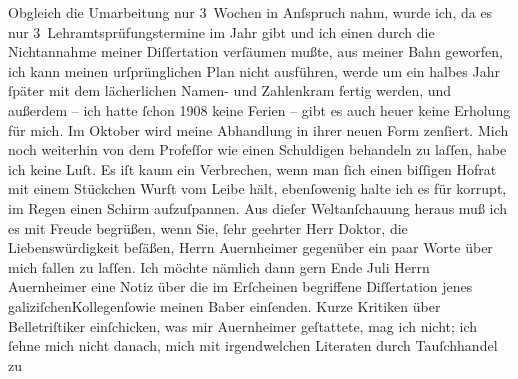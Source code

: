 \pstart
           Obgleich die Umarbeitung nur 3 Wochen in Anſspruch nahm, wurde ich, da es nur
               3 Lehramtsprüfungstermine im Jahr gibt und ich einen durch die Nichtannahme meiner
               Diſſertation verſäumen mußte, aus meiner Bahn geworfen, ich kann meinen
               urſprünglichen Plan nicht ausführen, werde um ein halbes Jahr ſpäter mit dem
               lächerlichen Namen- und Zahlenkram fertig werden, und außerdem – ich hatte ſchon
                  1908 keine Ferien – gibt es auch heuer keine Erholung für mich. Im
                  Oktober wird meine Abhandlung in ihrer neuen Form zenſiert. Mich noch weiterhin von dem Profeſſor wie einen
               Schuldigen behandeln zu laſſen, habe ich keine Luſt. Es iſt kaum ein Verbrechen, wenn
               man ſich einen biſſigen Hofrat mit einem Stückchen Wurſt vom Leibe hält, ebenſowenig
               halte ich es für korrupt, im Regen einen Schirm aufzuſpannen. Aus dieſer
               Weltanſchauung heraus muß ich es mit Freude begrüßen, wenn Sie, ſehr geehrter Herr
               Doktor, die Liebenswürdigkeit beſäßen, Herrn Auernheimer gegenüber ein paar Worte über mich fallen zu laſſen. Ich möchte
               nämlich dann gern Ende Juli Herrn Auernheimer eine Notiz über die im Erſcheinen begriffene Diſſertation jenes galiziſchenKollegenſowie meinen Baber einſenden. Kurze Kritiken über Belletriſtiker einſchicken,
               was mir Auernheimer geſtattete, mag ich nicht;
               ich ſehne mich nicht danach, mich mit irgendwelchen Literaten durch Tauſchhandel zu
